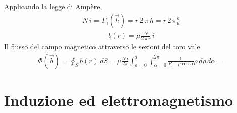 \documentclass[letterpaper,10pt,italian]{jupyterBook}
\begin{document}
\sphinxAtStartPar
Applicando la legge di Ampère,
\begin{equation*}
\begin{split}N \, i = \Gamma_{\gamma}(\vec{h}) = r \, 2 \, \pi \, h = r \, 2 \, \pi \frac{b}{\mu}\end{split}
\end{equation*}\begin{equation*}
\begin{split}b(r) = \mu \frac{N}{2 \, \pi \, r } \, i\end{split}
\end{equation*}
\sphinxAtStartPar
Il flusso del campo magnetico attraverso le sezioni del toro vale
\begin{equation*}
\begin{split}\Phi(\vec{b}) = \oint_{S} b(r) \, dS =  \mu \frac{N \, i}{2 \pi}\int_{\rho=0}^{a} \int_{\alpha=0}^{2\pi} \frac{1}{R - \rho \cos \alpha} \rho \, d \rho \, d \alpha  = \end{split}
\end{equation*}
\sphinxAtStartPar
{}

\sphinxstepscope


\section{Induzione ed elettromagnetismo}
\label{\detokenize{ch/electromagnetism/electromagnetism-general:induzione-ed-elettromagnetismo}}\label{\detokenize{ch/electromagnetism/electromagnetism-general:physics-hs-electromagnetism-electromagnetism-general}}\label{\detokenize{ch/electromagnetism/electromagnetism-general::doc}}
\end{document}
